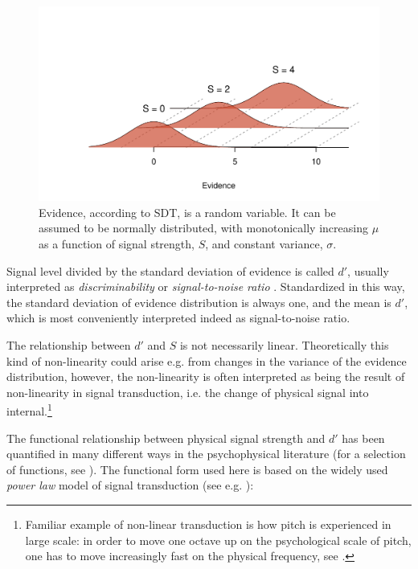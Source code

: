 \documentclass{article}\usepackage{knitr}
\begin{document}
\begin{figure}[!htb]
\begin{center}
\begin{knitrout}
\color{fgcolor}
\includegraphics[width=\maxwidth]{figure/unnamed-chunk-3-1} 
\end{knitrout}
\end{center}
\caption{Evidence, according to SDT, is a random  variable. It can be assumed to be normally distributed, with monotonically increasing $\mu$ as a function of signal strength, $S$, and constant variance, $\sigma$.}
\label{fig:SDT}
\end{figure}

Signal level divided by the standard deviation of evidence is called $d'$, usually interpreted as \textit{discriminability} \citep[Chapter 6]{kingdomprins2010} or \textit{signal-to-noise ratio} \citep{kontsevichtyler1999}. Standardized in this way, the standard deviation of evidence distribution is always one, and the mean is $d'$, which is most conveniently interpreted indeed as signal-to-noise ratio.

The relationship between $d'$ and $S$ is not necessarily linear. Theoretically this kind of non-linearity could  arise e.g. from changes in the variance of the evidence distribution, however, the non-linearity is often interpreted as being the result of non-linearity in signal transduction, i.e. the change of physical signal into internal.\footnote{Familiar example of non-linear transduction is how pitch is experienced in large scale: in order to move one octave up on the psychological scale of pitch, one has to move increasingly fast on the physical frequency, see \citet[Chapter 5]{zwickerfastl}.}

The functional relationship between physical signal strength and $d'$ has been quantified in many different ways in the psychophysical literature (for a selection of functions, see \citet[Appendix A]{lesmes2015}). The functional form used here is based on the widely used \textit{power law} model of signal transduction (see e.g. \citet{kontsevichtyler1999, dai2011, lesmes2015}):
\end{document}
